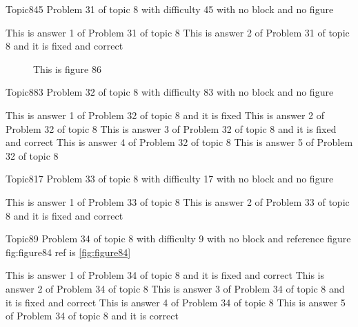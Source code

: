 \documentclass[master]{exam}
\begin{document}
\begin{problem}{Topic8}{45}
	Problem 31 of topic 8 with difficulty 45 with no block and no figure
	\begin{answers}
		\answer This is answer 1 of Problem 31 of topic 8 
		 This is answer 2 of Problem 31 of topic 8 and it is fixed and correct
	\end{answers}
\end{problem}



\begin{figure}
	\begin{center}
		This is figure 86 
		\label{fig:figure86}
	\end{center}
\end{figure}

\begin{problem}{Topic8}{83}
	Problem 32 of topic 8 with difficulty 83 with no block and no figure
	\begin{answers}
		\answer[fixed] This is answer 1 of Problem 32 of topic 8 and it is fixed
		\answer This is answer 2 of Problem 32 of topic 8 
		 This is answer 3 of Problem 32 of topic 8 and it is fixed and correct
		\answer This is answer 4 of Problem 32 of topic 8 
		\answer This is answer 5 of Problem 32 of topic 8 
	\end{answers}
\end{problem}

\begin{problem}{Topic8}{17}
	Problem 33 of topic 8 with difficulty 17 with no block and no figure
	\begin{answers}
		\answer This is answer 1 of Problem 33 of topic 8 
		 This is answer 2 of Problem 33 of topic 8 and it is fixed and correct
	\end{answers}
\end{problem}

\begin{problem}{Topic8}{9}
	Problem 34 of topic 8 with difficulty 9 with no block and reference figure fig:figure84 ref is \ref{fig:figure84}
	\begin{answers}
		 This is answer 1 of Problem 34 of topic 8 and it is fixed and correct
		\answer This is answer 2 of Problem 34 of topic 8 
		 This is answer 3 of Problem 34 of topic 8 and it is fixed and correct
		\answer This is answer 4 of Problem 34 of topic 8 
		\answer[correct] This is answer 5 of Problem 34 of topic 8 and it is correct
	\end{answers}
\end{problem}
\end{document}
